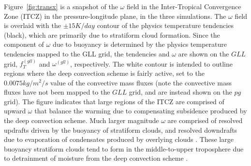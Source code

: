 \documentclass[draft,linenumbers]{agujournal}
\begin{document}
Figure~\ref{fig:transx} is a snapshot of the $\omega$ field in the Inter-Tropical Convergence Zone (ITCZ) in the pressure-longitude plane, in the three simulations. The $\omega$ field is overlaid with the $\pm 15 K/day$ contour of the physics temperature tendencies (black), which are primarily due to stratiform cloud formation. Since the component of $\omega$ due to buoyancy is determined by the physics temperature tendencies mapped to the GLL grid, the tendencies and $\omega$ are shown on the $GLL$ grid, $f_T^{(gll)}$ and $\omega^{(gll)}$, respectively. The white contour is intended to outline regions where the deep convection scheme is fairly active, set to the $0.0075 kg/m^2/s$ value of the convective mass fluxes (note the convective mass fluxes have not been mapped to the $GLL$ grid, and are instead shown on the $pg$ grid). The figure indicates that large regions of the ITCZ are comprised of upward $\omega$ that balance the warming due to compensating subsidence produced by the deep convection scheme. Much larger magnitude $\omega$ are comprised of resolved updrafts driven by the buoyancy of stratiform clouds, and resolved downdrafts due to evaporation of condensates produced by overlying clouds \citep{HR2018JAMES}. These large buoyancy stratiform clouds tend to form in the middle-to-upper troposphere due to detrainment of moisture from the deep convection scheme \citep{ZM1995AO}. 
\end{document}
